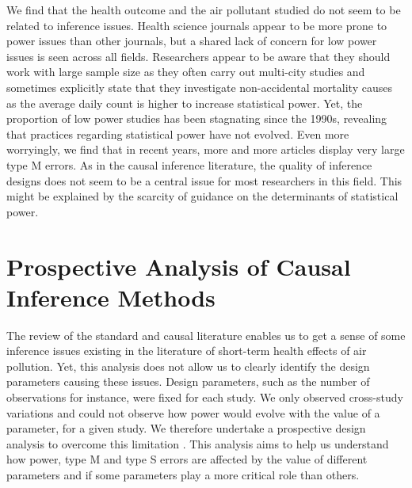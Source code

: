 \documentclass[12pt]{article}
\begin{document}
        We find that the health outcome and the air pollutant studied do not seem to be related to inference issues. Health science journals appear to be more prone to power issues than other journals, but a shared lack of concern for low power issues is seen across all fields. Researchers appear to be aware that they should work with large sample size as they often carry out multi-city studies and sometimes explicitly state that they investigate non-accidental mortality causes as the average daily count is higher to increase statistical power. Yet, the proportion of low power studies has been stagnating since the 1990s, revealing that practices regarding statistical power have not evolved. Even more worryingly, we find that in recent years, more and more articles display very large type M errors. As in the causal inference literature, the quality of inference designs does not seem to be a central issue for most researchers in this field. This might be explained by the scarcity of guidance on the determinants of statistical power.
        



\section{Prospective Analysis of Causal Inference Methods}

    The review of the standard and causal literature enables us to get a sense of some inference issues existing in the literature of short-term health effects of air pollution. Yet, this analysis does not allow us to clearly identify the design parameters causing these issues. Design parameters, such as the number of observations for instance, were fixed for each study. We only observed cross-study variations and could not observe how power would evolve with the value of a parameter, for a given study. We therefore undertake a prospective design analysis to overcome this limitation \citep{altoe_enhancing_2020}. This analysis aims to help us understand how power, type M and type S errors are affected by the value of different parameters and if some parameters play a more critical role than others. 
    
\end{document}
